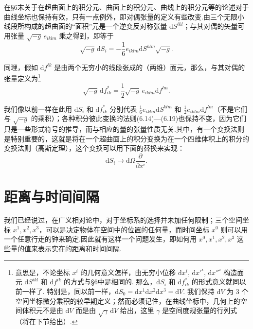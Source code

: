 在§6末关于在超曲面上的积分元、曲面上的积分元、曲线上的积分元等的论述对于曲线坐标也保持有效，只有一点例外，即对偶张量的定义有些改变.由三个无限小线段所构成的超曲面的“面积”元是一个逆变反对称张量 $\mathrm{d}S^{ikl}$；与其对偶的矢量可用张量 $\sqrt{-g}\,e_{iklm}$ 乘之得到，即等于
\begin{equation}
  \sqrt{-g}\,\mathrm{d}S_i
  =-\frac{1}{6}e_{iklm}\mathrm{d}S^{klm}\sqrt{-g}.
\end{equation}

同理，假如 $\mathrm{d}f^{ik}$ 是由两个无穷小的线段张成的（两维）面元，那么，与其对偶的张量定义为\footnote{意思是，不论坐标 $x^i$ 的几何意义怎样，由无穷小位移 $\mathrm{d}x^i$, $\mathrm{d}x'^{i}$, $\mathrm{d}x''^{i}$ 构造面元 $\mathrm{d}S^{ikl}$ 和 $\mathrm{d}f^{ik}$ 的方式与§6中是相同的. 那么，$\mathrm{d}S_i$ 和 $\mathrm{d}f^{*}_{ik}$ 的形式意义就同以前一样了. 特别是，同以前一样，$\mathrm{d}S_0=\mathrm{d}x^1\mathrm{d}x^2\mathrm{d}x^3=\mathrm{d}V$. 我们保持 $\mathrm{d}V$ 为 3 个空间坐标微分乘积的较早期定义；然而必须记住，在曲线坐标中，几何上的空间体积元不是由 $\mathrm{d}V$ 而是由 $\sqrt{\gamma}\,\mathrm{d}V$ 给出，这里 $\gamma$ 是空间度规张量的行列式（将在下节给出）.}
\begin{equation}
  \sqrt{-g}\,\mathrm{d}f^{*}_{ik}
  =\frac{1}{2}\sqrt{-g}\,e_{iklm}\mathrm{d}f^{lm}.
\end{equation}

我们像以前一样在此用 $\mathrm{d}S_i$ 和 $\mathrm{d}f^{*}_{ik}$ 分别代表 $\frac{1}{6}e_{iklm}\mathrm{d}S^{klm}$ 和 $\frac{1}{2}e_{iklm}\mathrm{d}f^{lm}$（不是它们与 $\sqrt{-g}$ 的乘积）；各种积分彼此变换的法则(6.14)—(6.19)也保持不变，因为它们只是一些形式符号的推导，而与相应的量的张量性质无关.其中，有一个变换法则是特别重要的，这就是将在一个超曲面上的积分变换为在一个四维体积上的积分的变换法则（高斯定理），这个变换可以用下面的替换来实现：
\begin{equation}
  \mathrm{d}S_i\to\mathrm{d}\varOmega\frac{\partial}{\partial x^i}.
\end{equation}

\section{距离与时间间隔}

我们已经说过，在广义相对论中，对于坐标系的选择并未加任何限制；三个空间坐标 $x^1,x^2,x^3$，可以是决定物体在空间中的位置的任何量，而时间坐标 $x^0$ 则可以用一个任意行走的钟来确定.因此就有这样一个问题发生，即如何用 $x^0,x^1,x^2,x^3$ 这些量的值来表示实在的距离和时间间隔.

